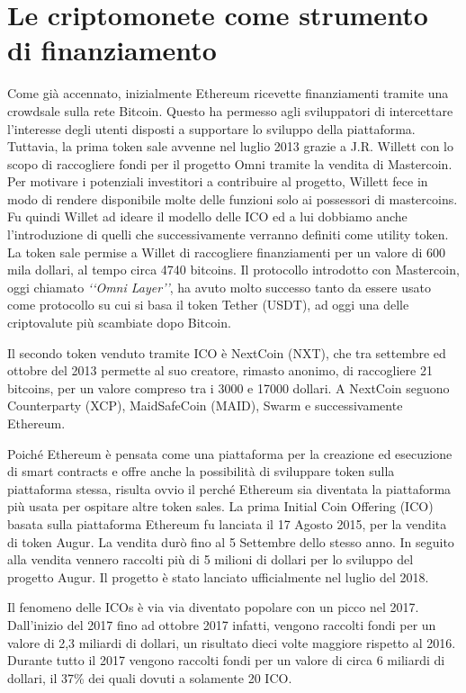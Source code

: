 \section{Le criptomonete come strumento di finanziamento}
Come già accennato, inizialmente Ethereum ricevette finanziamenti tramite una crowdsale sulla rete Bitcoin.  Questo ha permesso agli sviluppatori di intercettare l'interesse degli utenti disposti a supportare lo sviluppo della piattaforma. Tuttavia, la prima token sale avvenne nel luglio 2013 grazie a J.R. Willett con lo scopo di raccogliere fondi per il progetto Omni tramite la vendita di Mastercoin\cite{K23}. Per motivare i potenziali investitori a contribuire al progetto, Willett fece in modo di rendere disponibile molte delle funzioni solo ai possessori di mastercoins. Fu quindi Willet ad ideare il modello delle ICO ed a lui dobbiamo anche l'introduzione di quelli che successivamente verranno definiti come utility token. La token sale permise a Willet di raccogliere finanziamenti per un valore di 600 mila dollari, al tempo circa 4740 bitcoins. Il protocollo introdotto con Mastercoin, oggi chiamato \textit{‘‘Omni Layer’’}, ha avuto molto successo tanto da essere usato come protocollo su cui si basa il token Tether (USDT), ad oggi una delle criptovalute più scambiate dopo Bitcoin\cite{K24}. 

Il secondo token venduto tramite ICO è NextCoin (NXT), che tra settembre ed ottobre del 2013 permette al suo creatore, rimasto anonimo, di raccogliere 21 bitcoins, per un valore compreso tra i 3000 e 17000 dollari. A NextCoin seguono Counterparty (XCP), MaidSafeCoin (MAID), Swarm e successivamente Ethereum.\cite{K25,K26,K27,K28}

Poiché Ethereum è pensata come una piattaforma per la creazione ed esecuzione di smart contracts e offre anche la possibilità di sviluppare token sulla piattaforma stessa, risulta ovvio il perché Ethereum sia diventata la piattaforma più usata per ospitare altre token sales. La prima Initial Coin Offering (ICO) basata sulla piattaforma Ethereum fu lanciata il 17 Agosto 2015, per la vendita di token Augur\cite{K29}. La vendita durò fino al 5 Settembre dello stesso anno. In seguito alla vendita vennero raccolti più di 5 milioni di dollari per lo sviluppo del progetto Augur. Il progetto è stato lanciato ufficialmente nel luglio del 2018. 

Il fenomeno delle ICOs è via via diventato popolare con un picco nel 2017. Dall'inizio  del 2017 fino ad ottobre 2017 infatti, vengono raccolti fondi per un valore di 2,3 miliardi di dollari, un risultato dieci volte maggiore rispetto al 2016. 
Durante tutto il 2017 vengono raccolti fondi per un valore di circa 6 miliardi di dollari, il 37\% dei quali dovuti a solamente 20 ICO. 

